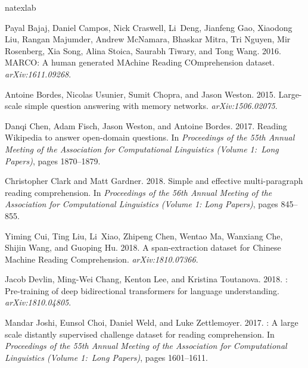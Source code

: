 \documentclass[11pt,a4paper]{article}
\begin{document}
\begin{thebibliography}{24}
\expandafter\ifx\csname natexlab\endcsname\relax\def\natexlab#1{#1}\fi

Payal Bajaj, Daniel Campos, Nick Craswell, Li~Deng, Jianfeng Gao, Xiaodong Liu,
  Rangan Majumder, Andrew McNamara, Bhaskar Mitra, Tri Nguyen, Mir Rosenberg,
  Xia Song, Alina Stoica, Saurabh Tiwary, and Tong Wang. 2016.
 {MARCO}: {A} human generated {MAchine} {Reading} {COmprehension}
  dataset.
\newblock \emph{arXiv:1611.09268}.

Antoine Bordes, Nicolas Usunier, Sumit Chopra, and Jason Weston. 2015.
\newblock Large-scale simple question answering with memory networks.
\newblock \emph{arXiv:1506.02075}.

Danqi Chen, Adam Fisch, Jason Weston, and Antoine Bordes. 2017.
\newblock Reading {Wikipedia} to answer open-domain questions.
\newblock In \emph{Proceedings of the 55th Annual Meeting of the Association
  for Computational Linguistics (Volume 1:\ Long Papers)}, pages 1870--1879.

Christopher Clark and Matt Gardner. 2018.
\newblock Simple and effective multi-paragraph reading comprehension.
\newblock In \emph{Proceedings of the 56th Annual Meeting of the Association
  for Computational Linguistics (Volume 1: Long Papers)}, pages 845--855.

Yiming Cui, Ting Liu, Li~Xiao, Zhipeng Chen, Wentao Ma, Wanxiang Che, Shijin
  Wang, and Guoping Hu. 2018.
\newblock A span-extraction dataset for {Chinese} {Machine} {Reading}
  {Comprehension}.
\newblock \emph{arXiv:1810.07366}.

Jacob Devlin, Ming-Wei Chang, Kenton Lee, and Kristina Toutanova. 2018.
: Pre-training of deep bidirectional transformers for language
  understanding.
\newblock \emph{arXiv:1810.04805}.

Mandar Joshi, Eunsol Choi, Daniel Weld, and Luke Zettlemoyer. 2017.
: A large scale distantly supervised challenge dataset for
  reading comprehension.
\newblock In \emph{Proceedings of the 55th Annual Meeting of the Association
  for Computational Linguistics (Volume 1:\ Long Papers)}, pages 1601--1611.


\end{thebibliography}
\end{document}

